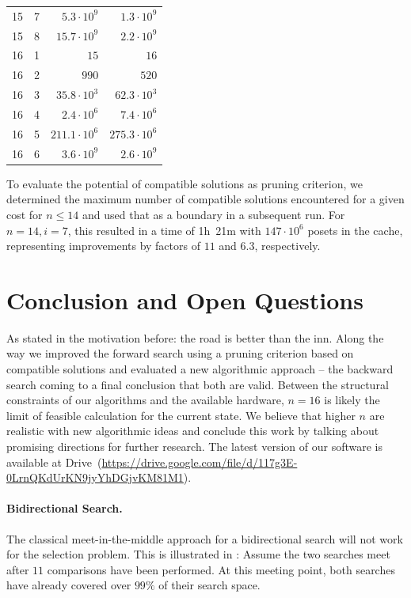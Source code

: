 \documentclass[twoside,leqno,twocolumn]{article}
\newcommand{\projectURL}[0]{https://drive.google.com/file/d/117g3E-0LrnQKdUrKN9jyYhDGjvKM81M1} %
\newcommand{\projectServer}[0]{Drive} %
\begin{document}
\begin{table}[!t]
\begin{tabular}{c|c|r|r}
    15  & 7   & $5.3 \cdot 10^9$        & $1.3 \cdot 10^9$         \\
    15  & 8   & $15.7 \cdot 10^9$       & $2.2 \cdot 10^9$         \\
    \hline
    16  & 1   & $15$                    & $16$                     \\
    16  & 2   & $990$                   & $520$                    \\
    16  & 3   & $35.8 \cdot 10^3$       & $62.3 \cdot 10^3$        \\
    16  & 4   & $2.4 \cdot 10^6$        & $7.4 \cdot 10^6$         \\
    16  & 5   & $211.1 \cdot 10^6$      & $275.3 \cdot 10^6$       \\
    16  & 6   & $3.6 \cdot 10^9$        & $2.6 \cdot 10^9$         \\
  \end{tabular}
\end{table}

To evaluate the potential of compatible solutions as pruning criterion, we determined the maximum number of compatible solutions encountered for a given cost for $n \leq 14$ and used that as a boundary in a subsequent run.
For $n = 14, i = 7$, this resulted in a time of 1h~21m with $147 \cdot 10^6$ posets in the cache, representing improvements by factors of $11$ and $6.3$, respectively.


\section{Conclusion and Open Questions}


As stated in the motivation before: the road is better than the inn.
Along the way we improved the forward search using a pruning criterion based on compatible solutions and evaluated a new algorithmic approach -- the backward search coming to a final conclusion that both are valid.
Between the structural constraints of our algorithms and the available hardware, $n=16$ is likely the limit of feasible calculation for the current state.
We believe that higher $n$ are realistic with new algorithmic ideas and conclude this work by talking about promising directions for further research.
The latest version of our software is available at \projectServer~(\url{\projectURL}).

\paragraph{Bidirectional Search.}
The classical meet-in-the-middle approach for a bidirectional search will not work for the selection problem.
This is illustrated in :
Assume the two searches meet after $11$ comparisons have been performed.
At this meeting point, both searches have already covered over $99\%$ of their search space.
\end{document}
